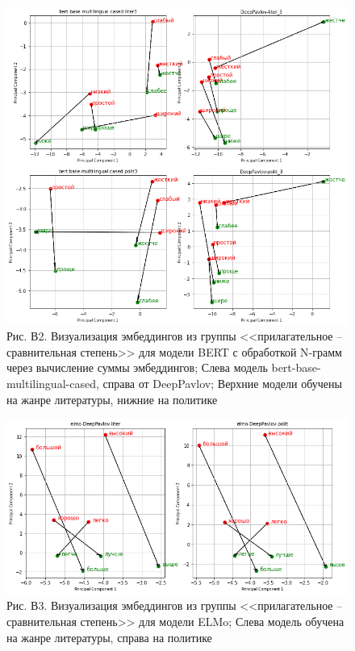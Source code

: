 \documentclass[a4paper,14pt]{article}
\begin{document}
\begin{figure}[H]
	\centering
	\includegraphics[width=0.95\linewidth]{image/pril_3}
	\caption*{Рис. В2. Визуализация эмбеддингов из группы <<прилагательное -- сравнительная степень>> для модели BERT с обработкой N-грамм через вычисление суммы эмбеддингов; Слева модель bert-base-multilingual-cased, справа от DeepPavlov; Верхние модели обучены на жанре литературы, нижние на политике}
	\label{fig:pril32}
\end{figure}

\begin{figure}[H]
	\centering
	\includegraphics[width=0.95\linewidth]{image/elmo_pil}
	\caption*{Рис. В3. Визуализация эмбеддингов из группы <<прилагательное -- сравнительная степень>> для модели ELMo; Слева модель обучена на жанре литературы, справа на политике}
	\label{fig:elmopil2}
\end{figure}
\end{document}
